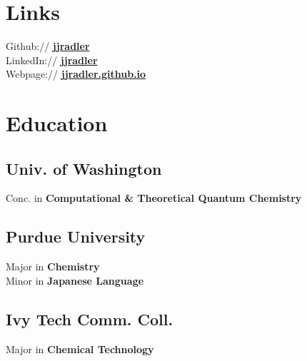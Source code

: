 \documentclass[letterpaper]{deedy-resume} %
\begin{document}
\begin{minipage}[t]{0.32\textwidth} %

\section{Links} 
Github:// \href{https://github.com/jjradler}{\bf jjradler} \\
LinkedIn:// \href{https://www.linkedin.com/in/jjradler/}{\bf jjradler} \\
Webpage:// \href{http://jjradler.github.io}{\bf jjradler.github.io}


\section{Education} 
\subsection{Univ. of Washington}
Conc. in \textbf{Computational \& Theoretical Quantum Chemistry}

\sectionspace %


\subsection{Purdue University}
Major in \textbf{Chemistry}\\
Minor in \textbf{Japanese Language}

\sectionspace

\subsection{Ivy Tech Comm. Coll.}
Major in \textbf{Chemical Technology}



\end{minipage}
\end{document}
